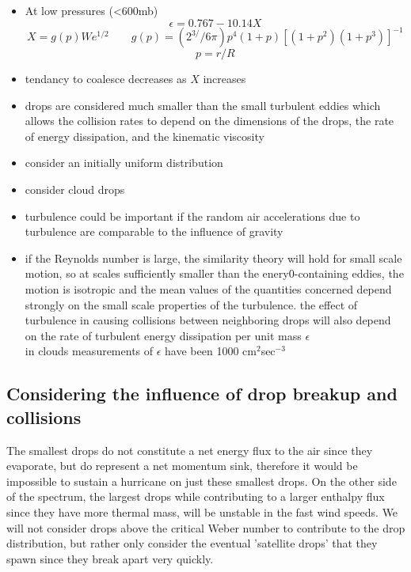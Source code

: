 \documentclass[10pt,a4paper]{article}
\begin{document}
\begin{itemize}
\item At low pressures (<600mb)
\[ \epsilon = 0.767 - 10.14X \]
\[ X= g(p)We^{1/2} \qquad g(p) = (2^{3/}/6\pi)p^4(1+p)[(1+p^2)(1+p^3)]^{-1}\]
\[p=r/R\]
\item
tendancy to coalesce decreases as $X$ increases

\item
drops are considered much smaller than the small turbulent eddies which allows the collision rates to depend on the dimensions of the drops, the rate of energy dissipation, and the kinematic viscosity
\item 
consider an initially uniform distribution
\item
consider cloud drops
\item
turbulence could be important if the random air accelerations due to turbulence are comparable to the influence of gravity
\item
if the Reynolds number is large, the similarity theory will hold for small scale motion, so at scales sufficiently smaller than the enery0-containing eddies, the motion is isotropic and the mean values of the quantities concerned depend strongly on the small scale properties of the turbulence. the effect of turbulence in causing collisions between neighboring drops will also depend on the rate of turbulent energy dissipation per unit mass $\epsilon$\\
in clouds measurements of $\epsilon$ have been 1000 cm$^2$sec$^{-3}$
\end{itemize}


\subsection{Considering the influence of drop breakup and collisions}
The smallest drops do not constitute a net energy flux to the air since they evaporate, but do represent a net momentum sink, therefore it would be impossible to sustain a hurricane on just these smallest drops. On the other side of the spectrum, the largest drops while contributing to a larger enthalpy flux since they have more thermal mass, will be unstable in the fast wind speeds. We will not consider drops above the critical Weber number to contribute to the drop distribution, but rather only consider the eventual 'satellite drops' that they spawn since they break apart very quickly. 
\end{document}
